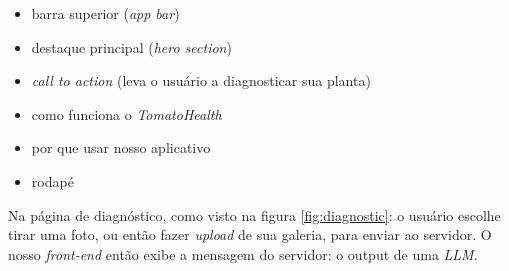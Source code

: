 \begin{itemize}
    \item barra superior (\textit{app bar})
    \item destaque principal (\textit{hero section})
    \item \textit{call to action} (leva o usuário a diagnosticar sua planta)
    \item como funciona o \emph{TomatoHealth}
    \item por que usar nosso aplicativo
    \item rodapé
\end{itemize}

Na página de diagnóstico, como visto na figura \ref{fig:diagnostic}: o usuário escolhe tirar uma foto, ou então fazer \textit{upload} de sua galeria, para enviar ao servidor. O nosso \textit{front-end} então exibe a mensagem do servidor: o output de uma \emph{LLM}.

